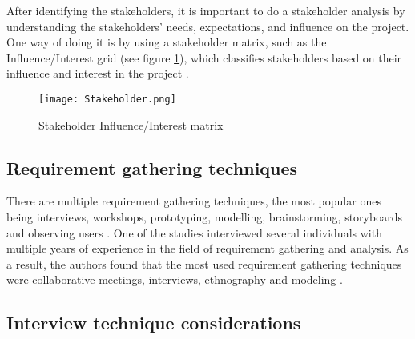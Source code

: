 After identifying the stakeholders, it is important to do a stakeholder analysis by understanding the stakeholders' needs, expectations, and influence on the project. One way of doing it is by using a stakeholder matrix, such as the Influence/Interest grid (see figure \ref{fig:stakeholder_matrix}), which classifies stakeholders based on their influence and interest in the project \parencite{stakeholders,stakeholders2}.

\begin{figure}[ht]
    \centering
    \texttt{[image: Stakeholder.png]}
    \caption{Stakeholder Influence/Interest matrix}
    \label{fig:stakeholder_matrix}
\end{figure}


\subsection{Requirement gathering techniques}

There are multiple requirement gathering techniques, the most popular ones being interviews, workshops, prototyping, modelling, brainstorming, storyboards and observing users \parencite{reqanalysis1,reqanalysis2, reqanalysis3, reqanalysis4}. One of the studies interviewed several individuals with multiple years of experience in the field of requirement gathering and analysis. As a result, the authors found that the most used requirement gathering techniques were collaborative meetings, interviews, ethnography and modeling \parencite{reqanalysis1}.

\subsection{Interview technique considerations}

